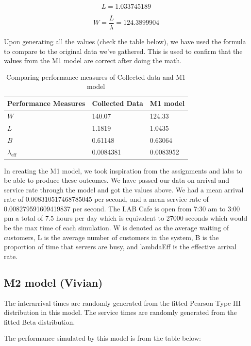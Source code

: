 \documentclass{article}
\begin{document}
$$
L = 1.033745189
$$

$$
W = \frac{L}{\lambda} = 124.3899904
$$



Upon generating all the values (check the table below), we have used the formula to compare to the original data we’ve gathered. This is used to confirm that the values from the M1 model are correct after doing the math.

\begin{table}[h!]
    \centering
    \caption{Comparing performance measures of Collected data and M1 model}
    \begin{tabu}{*{3}{X[c]}}
        \toprule
        \textbf{Performance Measures} & \textbf{Collected Data} & \textbf{M1 model}\\
        \midrule
        $W$ & 140.07 & 124.33\\
        $L$ & 1.1819 & 1.0435\\
        $B$ & 0.61148 & 0.63064\\
        $\lambda_{\text{eff}}$ & 0.0084381 & 0.0083952\\
        \bottomrule
    \end{tabu}
    \label{tab:M1}
\end{table}

In creating the M1 model, we took inspiration from the assignments and labs to be able to produce these outcomes. We have passed our data on arrival and service rate through the model and got the values above.
We had a mean arrival rate of 0.008310517468785045 per second, and a mean service rate of 0.008279591609419837 per second. The LAB Cafe is open from 7:30 am to 3:00 pm a total of 7.5 hours per day which is equivalent to 27000 seconds which would be the max time of each simulation. 
W is denoted as the average waiting of customers, L is the average number of customers in the system, B is the proportion of time that servers are busy, and lambdaEff is the effective arrival rate.

\subsection{M2 model (Vivian)}

The interarrival times are randomly generated from the fitted Pearson Type III distribution in this model. The service times are randomly generated from the fitted Beta distribution.

The performance simulated by this model is from the table below:
\end{document}
